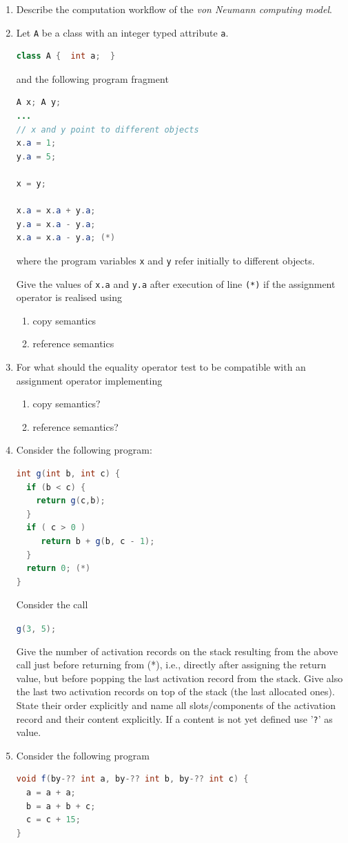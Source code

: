 \documentclass{article}
\begin{document}
\begin{enumerate}
\item Describe the computation workflow of the \emph{von Neumann
    computing model}.
\item Let \lstinline!A! be a class with an integer typed attribute
  \lstinline!a!.
\begin{lstlisting}[language=Java, columns=flexible]
class A {  int a;  }
\end{lstlisting}

and the following program fragment
\begin{lstlisting}[language=Java, columns=flexible] 
A x; A y;
...
// x and y point to different objects
x.a = 1;
y.a = 5;

x = y;

x.a = x.a + y.a;   
y.a = x.a - y.a;
x.a = x.a - y.a; (*)
\end{lstlisting}
where the program variables \lstinline!x! and \lstinline!y! refer
initially to different objects.

Give the values of \lstinline!x.a! and \lstinline!y.a! after execution
of line \lstinline!(*)! if the assignment operator is realised using
\begin{enumerate}
  \item copy semantics 
  \item reference semantics 
\end{enumerate}
\item For what should the equality operator test to be compatible with
  an assignment operator implementing 
  \begin{enumerate}
  \item copy semantics?
  \item reference semantics?
 \end{enumerate} 
\item Consider the following program:
\begin{lstlisting}[language=Java, columns=flexible] 
int g(int b, int c) {
  if (b < c) {
    return g(c,b); 
  }
  if ( c > 0 ) 
     return b + g(b, c - 1);
  }
  return 0; (*)
}
\end{lstlisting}

Consider the call 
\begin{center}
  \lstinline[language=Java, columns=flexible]{g(3, 5);} 
\end{center}
Give the number of activation records on the stack resulting from the
above call just before returning from (*), i.e., directly after
assigning the return value, but before popping the last activation
record from the stack. Give also the last two activation records on
top of the stack (the last allocated ones). State their order
explicitly and name all slots/components of the activation record and
their content explicitly. If a content is not yet defined use
'\texttt{?}' as value. 
\item Consider the following program
\begin{lstlisting}[language=Java, columns=flexible] 
void f(by-?? int a, by-?? int b, by-?? int c) {
  a = a + a;
  b = a + b + c;
  c = c + 15;
}


\end{lstlisting}
\end{enumerate}
\end{document}
